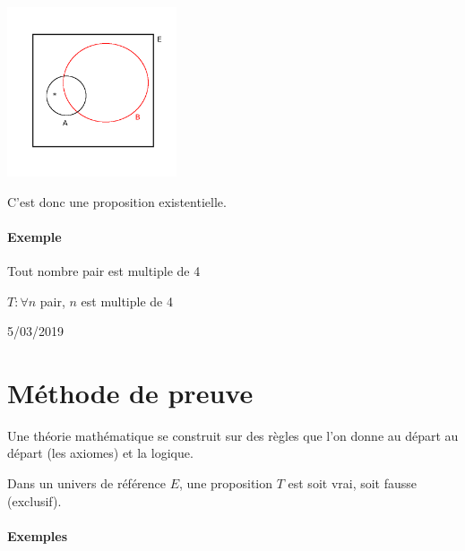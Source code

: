 \documentclass[
    11pt,
    a4paper,
    oneside,
    headinlcude, footinclude,
    twoside,
]{report}
\newcommand{\markDate}[1]{\begin{flushright}#1\end{flushright}}
\begin{document}
\begin{center}
    \includegraphics[width=5cm]{fig6}
\end{center}

C'est donc une proposition existentielle.

\paragraph{Exemple}
\label{par:exemple}

Tout nombre pair est multiple de 4

\begin{center}
    $T: \forall n$ pair, $n$ est multiple de 4
\end{center}

\markDate{5/03/2019}

\section{Méthode de preuve}
\label{sec:methode_de_preuve}

Une théorie mathématique se construit sur des règles que l'on donne au départ
au départ (les axiomes) et la logique.

Dans un univers de référence $E$, une proposition $T$ est soit vrai, soit
fausse (exclusif).

\paragraph{Exemples}
\end{document}
